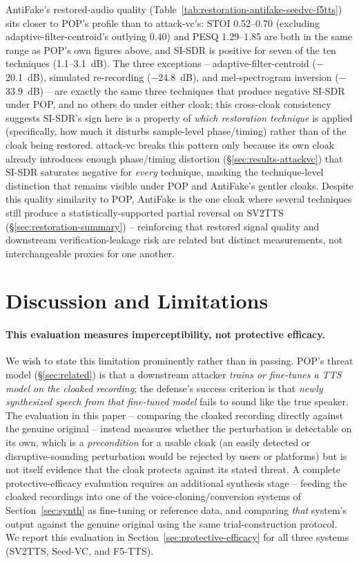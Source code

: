 \documentclass[11pt]{article}
\begin{document}
AntiFake's restored-audio quality (Table~\ref{tab:restoration-antifake-seedvc-f5tts})
sits closer to POP's profile than to attack-vc's: STOI 0.52--0.70
(excluding adaptive-filter-centroid's outlying 0.40) and PESQ 1.29--1.85
are both in the same range as POP's own figures above, and SI-SDR is
positive for seven of the ten techniques (1.1--3.1~dB). The three
exceptions -- adaptive-filter-centroid ($-$20.1~dB), simulated
re-recording ($-$24.8~dB), and mel-spectrogram inversion
($-$33.9~dB) -- are exactly the same three techniques that produce
negative SI-SDR under POP, and no others do under either cloak; this
cross-cloak consistency suggests SI-SDR's sign here is a property of
\emph{which restoration technique} is applied (specifically, how much
it disturbs sample-level phase/timing) rather than of the cloak being
restored. attack-vc breaks this pattern only because its own cloak
already introduces enough phase/timing distortion
(\S\ref{sec:results-attackvc}) that SI-SDR saturates negative for
\emph{every} technique, masking the technique-level distinction that
remains visible under POP and AntiFake's gentler cloaks. Despite this
quality similarity to POP, AntiFake is the one cloak where several
techniques still produce a statistically-supported partial reversal on
SV2TTS (\S\ref{sec:restoration-summary}) -- reinforcing that restored
signal quality and downstream verification-leakage risk are related but
distinct measurements, not interchangeable proxies for one another.

\section{Discussion and Limitations}
\label{sec:limitations}

\paragraph{This evaluation measures imperceptibility, not protective
efficacy.} We wish to state this limitation prominently rather than
in passing. POP's threat model (\S\ref{sec:related}) is that a
downstream attacker \emph{trains or fine-tunes a TTS model on the
cloaked recording}; the defense's success criterion is that
\emph{newly synthesized speech from that fine-tuned model} fails to
sound like the true speaker. The evaluation in this paper -- comparing
the cloaked recording directly against the genuine original -- instead
measures whether the perturbation is detectable on its own, which is a
\emph{precondition} for a usable cloak (an easily detected or
disruptive-sounding perturbation would be rejected by users or
platforms) but is not itself evidence that the cloak protects against
its stated threat. A complete protective-efficacy evaluation requires
an additional synthesis stage -- feeding the cloaked recordings into
one of the voice-cloning/conversion systems of
Section~\ref{sec:synth} as fine-tuning or reference data, and
comparing \emph{that} system's output against the genuine original
using the same trial-construction protocol. We report this evaluation
in Section~\ref{sec:protective-efficacy} for all three systems
(SV2TTS, Seed-VC, and F5-TTS).
\end{document}
